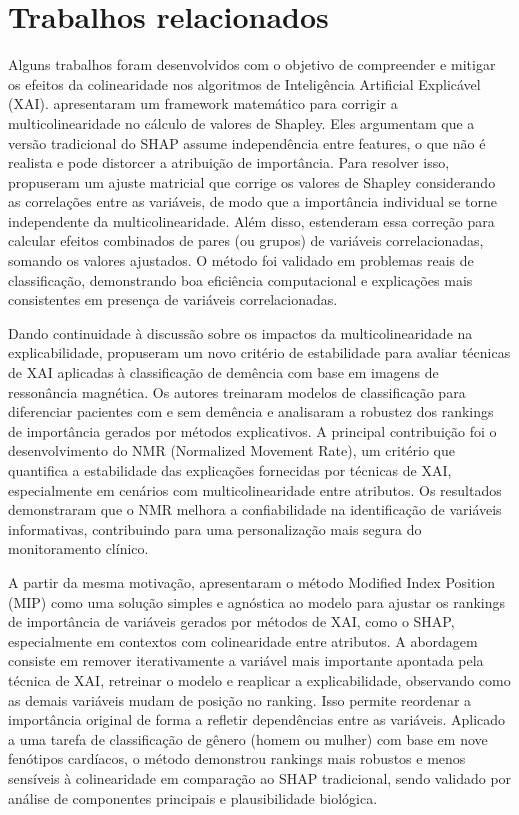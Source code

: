 \section{Trabalhos relacionados}\label{sec:trabalhos_relacionados}

Alguns trabalhos foram desenvolvidos com o objetivo de compreender e mitigar os efeitos da colinearidade nos algoritmos de Inteligência Artificial Explicável (XAI). \cite{Basu2022Multicollinearity} apresentaram um framework matemático para corrigir a multicolinearidade no cálculo de valores de Shapley. Eles argumentam que a versão tradicional do SHAP assume independência entre features, o que não é realista e pode distorcer a atribuição de importância. Para resolver isso, propuseram um ajuste matricial que corrige os valores de Shapley considerando as correlações entre as variáveis, de modo que a importância individual se torne independente da multicolinearidade. Além disso, estenderam essa correção para calcular efeitos combinados de pares (ou grupos) de variáveis correlacionadas, somando os valores ajustados. O método foi validado em problemas reais de classificação, demonstrando boa eficiência computacional e explicações mais consistentes em presença de variáveis correlacionadas.

Dando continuidade à discussão sobre os impactos da multicolinearidade na explicabilidade, \cite{Salih2022Investigating} propuseram um novo critério de estabilidade para avaliar técnicas de XAI aplicadas à classificação de demência com base em imagens de ressonância magnética. Os autores treinaram modelos de classificação para diferenciar pacientes com e sem demência e analisaram a robustez dos rankings de importância gerados por métodos explicativos. A principal contribuição foi o desenvolvimento do NMR (Normalized Movement Rate), um critério que quantifica a estabilidade das explicações fornecidas por técnicas de XAI, especialmente em cenários com multicolinearidade entre atributos. Os resultados demonstraram que o NMR melhora a confiabilidade na identificação de variáveis informativas, contribuindo para uma personalização mais segura do monitoramento clínico.

A partir da mesma motivação,  apresentaram o método Modified Index Position (MIP) como uma solução simples e agnóstica ao modelo para ajustar os rankings de importância de variáveis gerados por métodos de XAI, como o SHAP, especialmente em contextos com colinearidade entre atributos. A abordagem consiste em remover iterativamente a variável mais importante apontada pela técnica de XAI, retreinar o modelo e reaplicar a explicabilidade, observando como as demais variáveis mudam de posição no ranking. Isso permite reordenar a importância original de forma a refletir dependências entre as variáveis. Aplicado a uma tarefa de classificação de gênero (homem ou mulher) com base em nove fenótipos cardíacos, o método demonstrou rankings mais robustos e menos sensíveis à colinearidade em comparação ao SHAP tradicional, sendo validado por análise de componentes principais e plausibilidade biológica.

